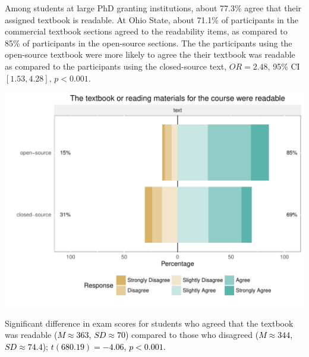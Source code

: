 \documentclass{ximera}
\begin{document}
Among students at large PhD granting institutions, about 77.3\% agree
that their assigned textbook is readable.  At Ohio State, about 71.1\%
of participants in the commercial textbook sections agreed to the
readability items, as compared to 85\% of participants in the
open-source sections.  The the participants using the open-source
textbook were more likely to agree the their textbook was readable as
compared to the participants using the closed-source text,
\(OR = 2.48\), 95\% CI \([ 1.53 , 4.28 ]\), \(p < 0.001\).

\begin{image}
  \includegraphics{more-readable.pdf}
\end{image}

Significant difference in exam scores for students who agreed that the
textbook was readable \textcolor{black}{(\(M \approx 363\),
  \(SD \approx 70\))} compared to those who disagreed
\textcolor{black}{(\(M \approx 344\), \(SD \approx 74.4\));}
\textcolor{black}{\(t( 680.19 ) = -4.06\), \(p < 0.001\).}
\end{document}
